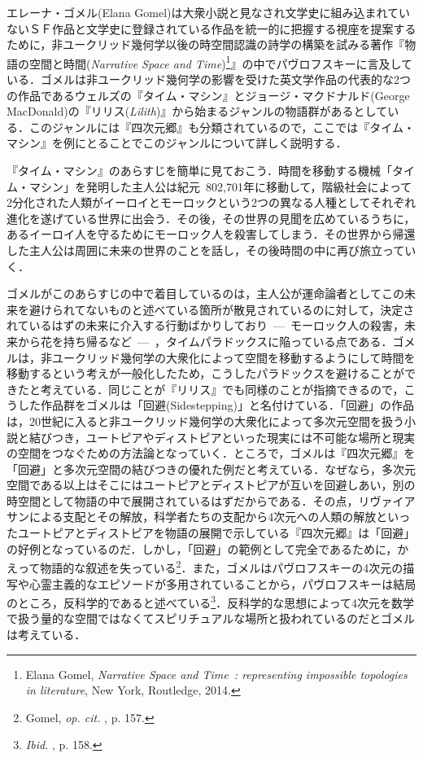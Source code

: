 エレーナ・ゴメル(Elana Gomel)は大衆小説と見なされ文学史に組み込まれていないＳＦ作品と文学史に登録されている作品を統一的に把握する視座を提案するために，非ユークリッド幾何学以後の時空間認識の詩学の構築を試みる著作『物語の空間と時間(\emph{Narrative Space and Time})\footnote{Elana Gomel, \emph{Narrative Space and Time~: representing impossible topologies in literature}, New York, Routledge, 2014.}』の中でパヴロフスキーに言及している．ゴメルは非ユークリッド幾何学の影響を受けた英文学作品の代表的な2つの作品であるウェルズの『タイム・マシン』とジョージ・マクドナルド(George MacDonald)の『リリス(\emph{Lilith})』から始まるジャンルの物語群があるとしている．このジャンルには『四次元郷』も分類されているので，ここでは『タイム・マシン』を例にとることでこのジャンルについて詳しく説明する．

『タイム・マシン』のあらすじを簡単に見ておこう．時間を移動する機械「タイム・マシン」を発明した主人公は紀元~802,701年に移動して，階級社会によって2分化された人類がイーロイとモーロックという2つの異なる人種としてそれぞれ進化を遂げている世界に出会う．その後，その世界の見聞を広めているうちに，あるイーロイ人を守るためにモーロック人を殺害してしまう．その世界から帰還した主人公は周囲に未来の世界のことを話し，その後時間の中に再び旅立っていく．

ゴメルがこのあらすじの中で着目しているのは，主人公が運命論者としてこの未来を避けられてないものと述べている箇所が散見されているのに対して，決定されているはずの未来に介入する行動ばかりしており~---~モーロック人の殺害，未来から花を持ち帰るなど~---~，タイムパラドックスに陥っている点である．ゴメルは，非ユークリッド幾何学の大衆化によって空間を移動するようにして時間を移動するという考えが一般化したため，こうしたパラドックスを避けることができたと考えている．同じことが『リリス』でも同様のことが指摘できるので，こうした作品群をゴメルは「回避(Sidestepping)」と名付けている．「回避」の作品は，20世紀に入ると非ユークリッド幾何学の大衆化によって多次元空間を扱う小説と結びつき，ユートピアやディストピアといった現実には不可能な場所と現実の空間をつなぐための方法論となっていく．ところで，ゴメルは『四次元郷』を「回避」と多次元空間の結びつきの優れた例だと考えている．なぜなら，多次元空間である以上はそこにはユートピアとディストピアが互いを回避しあい，別の時空間として物語の中で展開されているはずだからである．その点，リヴァイアサンによる支配とその解放，科学者たちの支配から4次元への人類の解放といったユートピアとディストピアを物語の展開で示している『四次元郷』は「回避」の好例となっているのだ．しかし，「回避」の範例として完全であるために，かえって物語的な叙述を失っている\footnote{Gomel, \emph{op. cit. }, p. 157.}．また，ゴメルはパヴロフスキーの4次元の描写や心霊主義的なエピソードが多用されていることから，パヴロフスキーは結局のところ，反科学的であると述べている\footnote{\emph{Ibid. }, p. 158.}．反科学的な思想によって4次元を数学で扱う量的な空間ではなくてスピリチュアルな場所と扱われているのだとゴメルは考えている．

